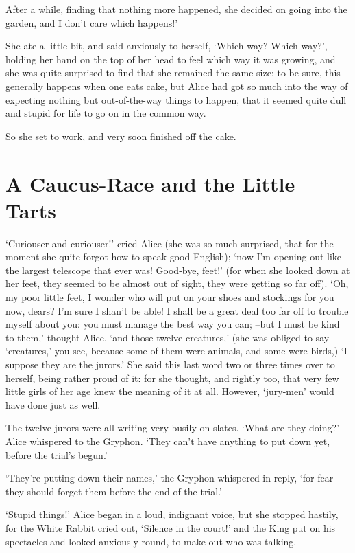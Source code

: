 \documentclass[statementpaper,twoside,openany]{memoir}
\begin{document}
After a while, finding that nothing more happened, she decided on going into the garden, and I don't care which happens!'

She ate a little bit, and said anxiously to herself, `Which way? Which way?', holding her hand on the top of her head to feel which way it was growing, and she was quite surprised to find that she remained the same size: to be sure, this generally happens when one eats cake, but Alice had got so much into the way of expecting nothing but out-of-the-way things to happen, that it seemed quite dull and stupid for life to go on in the common way.

So she set to work, and very soon finished off the cake.

\chapter{A Caucus-Race and the Little Tarts}

`Curiouser and curiouser!' cried Alice (she was so much surprised, that for the moment she quite forgot how to speak good English); `now I'm opening out like the largest telescope that ever was! Good-bye, feet!' (for when she looked down at her feet, they seemed to be almost out of sight, they were getting so far off). `Oh, my poor little feet, I wonder who will put on your shoes and stockings for you now, dears? I'm sure I shan't be able! I shall be a great deal too far off to trouble myself about you: you must manage the best way you can; --but I must be kind to them,' thought Alice, `and those twelve creatures,' (she was obliged to say `creatures,' you see, because some of them were animals, and some were birds,) `I suppose they are the jurors.' She said this last word two or three times over to herself, being rather proud of it: for she thought, and rightly too, that very few little girls of her age knew the meaning of it at all. However, `jury-men' would have done just as well.

The twelve jurors were all writing very busily on slates. `What are they doing?' Alice whispered to the Gryphon. `They can't have anything to put down yet, before the trial's begun.'

`They're putting down their names,' the Gryphon whispered in reply, `for fear they should forget them before the end of the trial.'

`Stupid things!' Alice began in a loud, indignant voice, but she stopped hastily, for the White Rabbit cried out, `Silence in the court!' and the King put on his spectacles and looked anxiously round, to make out who was talking.
\end{document}
